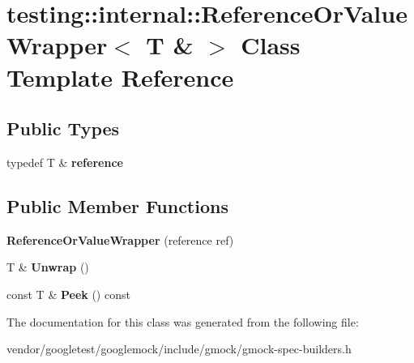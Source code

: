 \hypertarget{classtesting_1_1internal_1_1_reference_or_value_wrapper_3_01_t_01_6_01_4}{}\section{testing\+:\+:internal\+:\+:Reference\+Or\+Value\+Wrapper$<$ T \& $>$ Class Template Reference}
\label{classtesting_1_1internal_1_1_reference_or_value_wrapper_3_01_t_01_6_01_4}
\subsection*{Public Types}
\begin{DoxyCompactItemize}
\item 
\mbox{\label{classtesting_1_1internal_1_1_reference_or_value_wrapper_3_01_t_01_6_01_4_a62e7f6ebcf40daa08130ea52fd0215ee}} 
typedef T \& {\bfseries reference}
\end{DoxyCompactItemize}
\subsection*{Public Member Functions}
\begin{DoxyCompactItemize}
\item 
\mbox{\label{classtesting_1_1internal_1_1_reference_or_value_wrapper_3_01_t_01_6_01_4_ad31b242ceae7f318096c78a798b33379}} 
{\bfseries Reference\+Or\+Value\+Wrapper} (reference ref)
\item 
\mbox{\label{classtesting_1_1internal_1_1_reference_or_value_wrapper_3_01_t_01_6_01_4_a0b95dd4e20f237aee89864507172706e}} 
T \& {\bfseries Unwrap} ()
\item 
\mbox{\label{classtesting_1_1internal_1_1_reference_or_value_wrapper_3_01_t_01_6_01_4_a2a4ad5debafad859d2ad51ba8473c92a}} 
const T \& {\bfseries Peek} () const
\end{DoxyCompactItemize}


The documentation for this class was generated from the following file\+:\begin{DoxyCompactItemize}
\item 
vendor/googletest/googlemock/include/gmock/gmock-\/spec-\/builders.\+h\end{DoxyCompactItemize}

